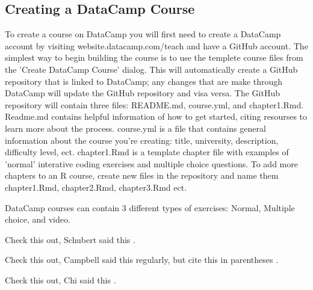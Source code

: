 \documentclass{tise_style}
\begin{document}
\subsection{Creating a DataCamp Course}
To create a course on DataCamp you will first need to create a DataCamp account by visiting website\www.datacamp.com/teach and
have a GitHub account. The simplest way to begin building the course is to use the templete course files from the 'Create
DataCamp Course' dialog. This will automatically create a GitHub repository that is linked to DataCamp; any changes that are 
make through DataCamp will update the GitHub repository and visa versa. The GitHub repository will contain three files: 
README.md, course.yml, and chapter1.Rmd.
Readme.md contains helpful information of how to get started, citing resourses to learn more about the process. 
course.yml is a file that contains general information about the course you're creating: title, university, description, 
difficulty level, ect.  
chapter1.Rmd is a template chapter file with examples of 'normal' interative coding exercises and multiple choice questions.
To add more chapters to an R course, create new files in the repository and name them chapter1.Rmd, chapter2.Rmd, chapter3.Rmd
ect.

DataCamp courses can contain 3 different types of exercises: Normal, Multiple choice, and video.


Check this out, Schubert said this \cite{Schubert13}.


Check this out, Campbell said this \cite{Campbell02} regularly, but cite this in parentheses \citep{Campbell02}.


Check this out, Chi said this \cite{Chi81}.




\end{document}
